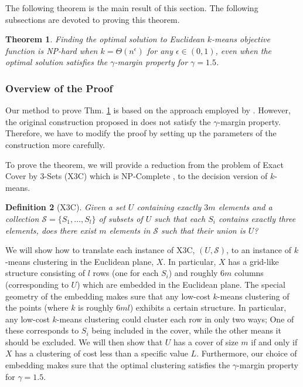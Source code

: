\documentclass{article}
\newcommand{\mc}{\mathcal}
\newtheorem{theorem}{Theorem}
\newtheorem{definition}[theorem]{Definition}
\begin{document}
The following theorem is the main result of this section. The following subsections are devoted to proving this theorem.

\begin{theorem}
\label{thm:gammaLower}
Finding the optimal solution to Euclidean $k$-means objective function is NP-hard when $k=\Theta(n^\epsilon)$ for any $\epsilon \in (0,1)$, even when the optimal solution satisfies the $\gamma$-margin property for $\gamma = 1.5$.
\end{theorem}

\subsubsection{Overview of the Proof}

Our method to prove Thm. \ref{thm:gammaLower} is based on the approach employed by \cite{vattani2009hardness}. However, the original construction proposed in \cite{vattani2009hardness} does not satisfy the $\gamma$-margin property. Therefore, we have to modify the proof by setting up the parameters of the construction more carefully. 

To prove the theorem, we will provide a reduction from the problem of Exact Cover by 3-Sets (X3C) which is NP-Complete \cite{garey2002computers}, to the decision version of $k$-means.

\begin{definition}[X3C]
Given a set $U$ containing exactly $3m$ elements and a collection $\mc S = \{S_1, \ldots, S_l\}$ of subsets of $U$ such that each $S_i$ contains exactly three elements, does there exist $m$ elements in $\mc S$ such that their union is $U$? 
\end{definition}

We will show how to translate each instance of X3C, $(U,\mc S)$, to an instance of $k$-means clustering in the Euclidean plane, $X$. In particular, $X$ has a grid-like structure consisting of $l$ rows (one for each $S_i$) and roughly $6m$ columns (corresponding to $U$) which are embedded in the Euclidean plane. The special geometry of the embedding makes sure that any low-cost $k$-means clustering of the points (where $k$ is roughly $6ml$) exhibits a certain structure. In particular, any low-cost $k$-means clustering could cluster each row in only two ways; One of these corresponds to $S_i$ being included in the cover, while the other means it should be excluded. We will then show that $U$ has a cover of size $m$ if and only if $X$ has a clustering of cost less than a specific value $L$. Furthermore, our choice of embedding makes sure that the optimal clustering satisfies the $\gamma$-margin property for $\gamma=1.5$.
\end{document}
